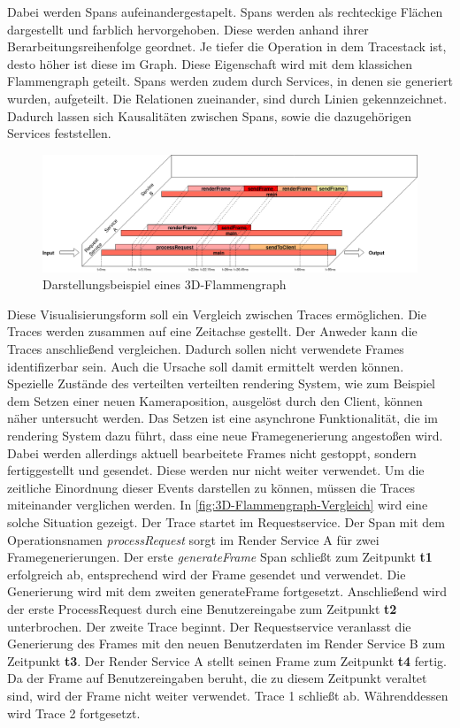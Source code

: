 Dabei werden Spans aufeinandergestapelt. Spans werden als rechteckige Flächen dargestellt und farblich hervorgehoben.	Diese werden anhand ihrer Berarbeitungsreihenfolge geordnet. Je tiefer die Operation in dem Tracestack ist, desto höher ist diese im Graph. Diese Eigenschaft wird mit dem klassichen Flammengraph geteilt. Spans werden zudem durch Services, in denen sie generiert wurden, aufgeteilt. Die Relationen zueinander, sind durch Linien gekennzeichnet. Dadurch lassen sich Kausalitäten zwischen Spans, sowie die dazugehörigen Services feststellen.

\begin{figure}[!ht]
	\centering
	\hspace*{-2cm}  
	\includegraphics[scale=0.36]{img/Design/3D-Flammengraph-Konzept.png}
	\caption[Darstellungsbeispiel eines 3D-Flammengraph ]{ Darstellungsbeispiel eines 3D-Flammengraph}
	\label{fig:3D-Flammengraph-Konzept}
\end{figure}

Diese Visualisierungsform soll ein Vergleich zwischen Traces ermöglichen. Die Traces werden zusammen auf eine Zeitachse gestellt. Der Anweder kann die Traces anschließend vergleichen. Dadurch sollen nicht verwendete Frames identifizerbar sein. Auch die Ursache soll damit ermittelt werden können. Spezielle Zustände des verteilten verteilten rendering System, wie zum Beispiel dem Setzen einer neuen Kameraposition, ausgelöst durch den Client, können näher untersucht werden. Das Setzen ist eine asynchrone Funktionalität, die im rendering System dazu führt, dass eine neue Framegenerierung angestoßen wird. Dabei werden allerdings aktuell bearbeitete Frames nicht gestoppt, sondern fertiggestellt und gesendet. Diese werden nur nicht weiter verwendet. Um die zeitliche Einordnung dieser Events darstellen zu können, müssen die Traces miteinander verglichen werden. In \cref{fig:3D-Flammengraph-Vergleich} wird eine solche Situation gezeigt. Der Trace startet im Requestservice. Der Span mit dem Operationsnamen \emph{processRequest} sorgt im Render Service A für zwei Framegenerierungen. Der erste \emph{generateFrame} Span schließt zum Zeitpunkt \textbf{t1} erfolgreich ab, entsprechend wird der Frame gesendet und verwendet. Die Generierung wird mit dem zweiten generateFrame fortgesetzt. Anschließend wird der erste ProcessRequest durch eine Benutzereingabe zum Zeitpunkt \textbf{t2} unterbrochen. Der zweite Trace beginnt. Der Requestservice veranlasst die Generierung des Frames mit den neuen Benutzerdaten im Render Service B zum Zeitpunkt \textbf{t3}. Der Render Service A stellt seinen Frame zum Zeitpunkt \textbf{t4} fertig. Da der Frame auf Benutzereingaben beruht, die zu diesem Zeitpunkt veraltet sind, wird der Frame nicht weiter verwendet. Trace 1 schließt ab. Währenddessen wird Trace 2 fortgesetzt.

